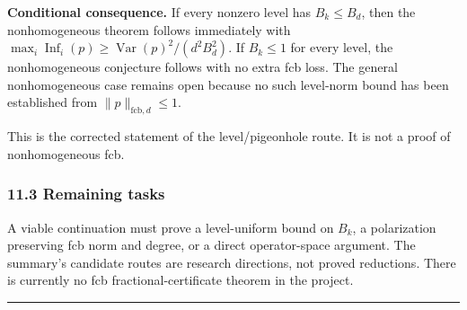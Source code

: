 \textbf{Conditional consequence.} If every nonzero level has \(B_k\le B_d\), then the nonhomogeneous theorem follows immediately with \(\max_i\operatorname{Inf}_i(p)\ge\operatorname{Var}(p)^2/(d^2B_d^2)\). If \(B_k\le1\) for every level, the nonhomogeneous conjecture follows with no extra fcb loss. The general nonhomogeneous case remains open because no such level-norm bound has been established from \(\|p\|_{\mathrm{fcb},d}\le1\).

This is the corrected statement of the level/pigeonhole route. It is not a proof of nonhomogeneous fcb.

\subsubsection{11.3 Remaining tasks}\label{remaining-tasks}

A viable continuation must prove a level-uniform bound on \(B_k\), a polarization preserving fcb norm and degree, or a direct operator-space argument. The summary's candidate routes are research directions, not proved reductions. There is currently no fcb fractional-certificate theorem in the project.

\begin{center}\rule{0.5\linewidth}{0.5pt}\end{center}
